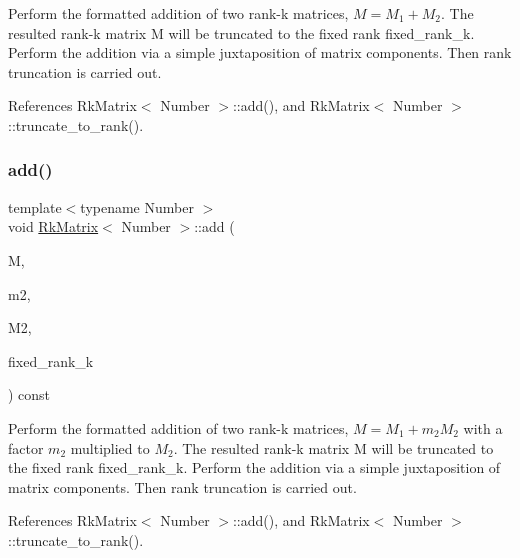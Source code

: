 Perform the formatted addition of two rank-\/k matrices, $M = M_1 + M_2$. The resulted rank-\/k matrix {\ttfamily M} will be truncated to the fixed rank {\ttfamily fixed\+\_\+rank\+\_\+k}. Perform the addition via a simple juxtaposition of matrix components. Then rank truncation is carried out.

References Rk\+Matrix$<$ Number $>$\+::add(), and Rk\+Matrix$<$ Number $>$\+::truncate\+\_\+to\+\_\+rank().

\mbox{\label{classRkMatrix_aeba05e73aa670b1029c1720e56d10e81}} 
\subsubsection{\texorpdfstring{add()}{add()}\hspace{0.1cm}{\footnotesize\ttfamily [6/8]}}
{\footnotesize\ttfamily template$<$typename Number $>$ \\
void \hyperlink{classRkMatrix}{Rk\+Matrix}$<$ Number $>$\+::add (\begin{DoxyParamCaption}\item[{\hyperlink{classRkMatrix}{Rk\+Matrix}$<$ Number $>$ \&}]{M,  }\item[{const Number}]{m2,  }\item[{const \hyperlink{classRkMatrix}{Rk\+Matrix}$<$ Number $>$ \&}]{M2,  }\item[{const \hyperlink{classRkMatrix_add060bfc3a4cc77f858c3d6dd58cadd5}{size\+\_\+type}}]{fixed\+\_\+rank\+\_\+k }\end{DoxyParamCaption}) const}

Perform the formatted addition of two rank-\/k matrices, $M = M_1 + m_2 M_2$ with a factor $m_2$ multiplied to $M_2$. The resulted rank-\/k matrix {\ttfamily M} will be truncated to the fixed rank {\ttfamily fixed\+\_\+rank\+\_\+k}. Perform the addition via a simple juxtaposition of matrix components. Then rank truncation is carried out.

References Rk\+Matrix$<$ Number $>$\+::add(), and Rk\+Matrix$<$ Number $>$\+::truncate\+\_\+to\+\_\+rank().

\mbox{\label{classRkMatrix_a1f51eac54ddb43c0670a72da62bc1e55}} 
